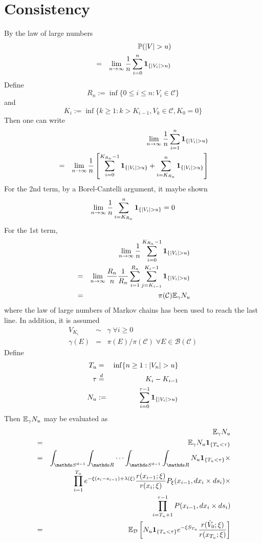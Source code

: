 \documentclass{article}
\theoremstyle{remark}
\begin{document}
\section{Consistency}\label{sec:consistency}
By the law of large numbers
\begin{eqnarray*}
  && \mathbb{P}(|V| > u) \\
  &=& \lim_{n \to \infty} {1 \over n} \sum_{i=0}^n \mathbf{1}_{\{|V_i| > u\}}
\end{eqnarray*}
Define
\[
R_n := \inf\{0 \leq i \leq n: V_i \in \mathcal C\}
\]
and
\[
K_i := \inf\{k \geq 1: k > K_{i-1}, V_k \in \mathcal C, K_0 = 0\}
\]
Then one can write
\begin{eqnarray*}
  && \lim_{n \to \infty} {1 \over n} \sum_{i=1}^n \mathbf{1}_{\{|V_i| > u\}} \\
  &=& \lim_{n \to \infty} {1 \over n} \left[
    \sum_{i=0}^{K_{R_n}-1} \mathbf{1}_{\{|V_i| > u\}} + \sum_{i=K_{R_n}}^n \mathbf{1}_{\{|V_i| > u\}}
\right]
\end{eqnarray*}
For the 2nd term, by a Borel-Cantelli argument, it maybe shown
\[
\lim_{n \to \infty} {1 \over n}\sum_{i=K_{R_n}}^n \mathbf{1}_{\{|V_i| > u\}} = 0
\]
For the 1st term,
\begin{eqnarray*}
&& \lim_{n \to \infty} {1 \over n} \sum_{i=0}^{K_{R_n}-1} \mathbf{1}_{\{|V_i| >
  u\}}  \\
&=& \lim_{n \to \infty} {R_n \over n} {1 \over R_n} \sum_{i=1}^{R_n}
\sum_{j=K_{i-1}}^{K_i-1}\mathbf{1}_{\{|V_i| > u\}} \\
&=& \pi(\mathcal C) \mathbb{E}_\gamma N_u
\end{eqnarray*}
where the law of large numbers of Markov chains has been used to reach
the last line. In addition, it is assumed
\begin{eqnarray*}
  V_{K_i} &\sim& \gamma \; \forall i \geq 0 \\
  \gamma(E) &=& \pi(E)/\pi(\mathcal C)\; \forall E \in \mathcal
  B(\mathcal C)
\end{eqnarray*}
Define
\begin{eqnarray*}
  T_u &=& \inf\{n \geq 1: |V_n| > u\} \\
  \tau &\overset{d}{=}& K_i - K_{i-1} \\
  N_u &:=& \sum_{i=0}^{\tau-1} \mathbf{1}_{\{|V_i| > u\}}  \\
\end{eqnarray*}
Then $\mathbb{E}_\gamma N_u$ may be evaluated as
\begin{eqnarray*}
  && \E_\gamma N_u \\
  &=& \E_\gamma N_u \1{T_u < \tau} \\
  &=& \int_{\mathds S^{d-1}} \int_{\mathds R} \cdots \int_{\mathds
    S^{d-1}} \int_{\mathds R} N_u \1{T_u < \tau} \times \\
  && \prod_{i=1}^{T_u} e^{-\xi(s_i - s_{i-1}) + \lambda(\xi)}
  {r(x_{i-1}; \xi) \over r(x_{i}; \xi)}P_\xi(x_{i-1}, dx_i \times ds_i) \times \\
  && \prod_{i=T_u+1}^{\tau-1} P(x_{i-1}, dx_i \times d s_i) \\
  &=& \E_{\mathcal D} \left[
    N_u \1{T_u < \tau} e^{-\xi S_{T_u}} {r(\tilde V_0; \xi)
      \over r(x_{T_u}; \xi)}
  \right]
\end{eqnarray*}
\end{document}
